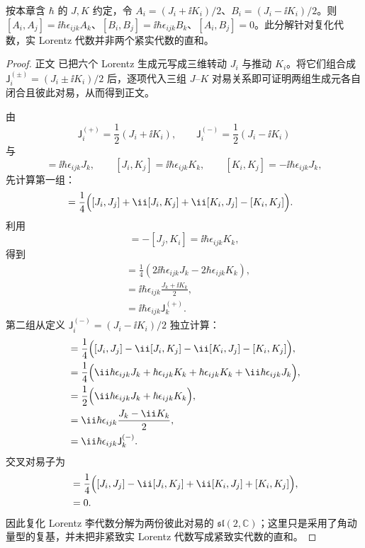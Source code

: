 \begin{theorem}
按本章含 $\hbar$ 的 $J,K$ 约定，令 $A_i=(J_i+\ii K_i)/2$、$B_i=(J_i-\ii K_i)/2$。则 $[A_i,A_j]=\ii\hbar\epsilon_{ijk}A_k$、$[B_i,B_j]=\ii\hbar\epsilon_{ijk}B_k$、$[A_i,B_j]=0$。此分解针对复化代数，实 Lorentz 代数并非两个紧实代数的直和。
\end{theorem}
\begin{proof}
正文 已把六个 Lorentz 生成元写成三维转动 $J_i$ 与推动 $K_i$。将它们组合成 $\mathsf J_i^{(\pm)}=(J_i\pm\ii K_i)/2$ 后，逐项代入三组 $J$--$K$ 对易关系即可证明两组生成元各自闭合且彼此对易，从而得到正文。



由
\begin{equation*}
 \mathsf J_i^{(+)}=\frac12(J_i+\ii K_i),
 \qquad
 \mathsf J_i^{(-)}=\frac12(J_i-\ii K_i)
\end{equation*}
与
\begin{equation*}
 [J_i,J_j]=\ii\hbar\epsilon_{ijk}J_k,
 \qquad
 [J_i,K_j]=\ii\hbar\epsilon_{ijk}K_k,
 \qquad
 [K_i,K_j]=-\ii\hbar\epsilon_{ijk}J_k,
\end{equation*}
先计算第一组：
\begin{align*}
 [\mathsf J_i^{(+)},\mathsf J_j^{(+)}]
 &=\frac14\Bigl(
 [J_i,J_j]+\ii[J_i,K_j]
 +\ii[K_i,J_j]-[K_i,K_j]\Bigr).
\end{align*}
利用
\begin{equation*}
 [K_i,J_j]=-[J_j,K_i]
 =\ii\hbar\epsilon_{ijk}K_k,
\end{equation*}
得到
\begin{align*}
 [\mathsf J_i^{(+)},\mathsf J_j^{(+)}]
 &=\frac14\left(
 2\ii\hbar\epsilon_{ijk}J_k
 -2\hbar\epsilon_{ijk}K_k\right),\\
 &=\ii\hbar\epsilon_{ijk}
 \frac{J_k+\ii K_k}{2},\\
 &=\ii\hbar\epsilon_{ijk}\mathsf J_k^{(+)}.
\end{align*}
第二组从定义 $\mathsf J_i^{(-)}=(J_i-\ii K_i)/2$ 独立计算：
\begin{align*}
 [\mathsf J_i^{(-)},\mathsf J_j^{(-)}]
 &=\frac14\Bigl(
 [J_i,J_j]-\ii[J_i,K_j]
 -\ii[K_i,J_j]-[K_i,K_j]\Bigr),\\
 &=\frac14\Bigl(
 \ii\hbar\epsilon_{ijk}J_k
 +\hbar\epsilon_{ijk}K_k
 +\hbar\epsilon_{ijk}K_k
 +\ii\hbar\epsilon_{ijk}J_k\Bigr),\\
 &=\frac12\Bigl(
 \ii\hbar\epsilon_{ijk}J_k
 +\hbar\epsilon_{ijk}K_k\Bigr),\\
 &=\ii\hbar\epsilon_{ijk}\frac{J_k-\ii K_k}{2},\\
 &=\ii\hbar\epsilon_{ijk}\mathsf J_k^{(-)}.
\end{align*}
交叉对易子为
\begin{align*}
 [\mathsf J_i^{(+)},\mathsf J_j^{(-)}]
 &=\frac14\Bigl(
 [J_i,J_j]-\ii[J_i,K_j]
 +\ii[K_i,J_j]+[K_i,K_j]\Bigr),\\
 &=0.
\end{align*}
因此复化 Lorentz 李代数分解为两份彼此对易的 $\mathfrak{sl}(2,\mathbb C)$；这里只是采用了角动量型的复基，并未把非紧致实 Lorentz 代数写成紧致实代数的直和。
\end{proof}

